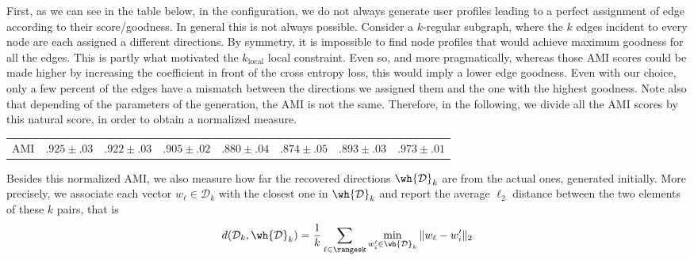 First, as we can see in the table below, in the  configuration, we do not always
generate user profiles leading to a perfect assignment of edge according to their score/goodness. In
general this is not always possible. Consider a $k$-regular subgraph, where the $k$ edges incident
to every node are each assigned a different directions. By symmetry, it is impossible to find node
profiles that would achieve maximum goodness for all the edges. This is partly what motivated the
$k_{\mathrm{local}}$ local constraint. Even so, and more pragmatically, whereas those AMI scores
could be made higher by increasing the coefficient in front of the cross entropy loss, this would
imply a lower edge goodness. Even with our choice, only a few percent of the edges have a mismatch
between the directions we assigned them and the one with the highest goodness. Note also that
depending of the parameters of the generation, the AMI is not the same. Therefore, in the following,
we divide all the AMI scores by this natural score, in order to obtain a normalized measure.
\newline\vspace{.5\baselineskip}\noindent%
\begin{tabular}{lccccccc}
  \toprule
  {}  & {\smallk{}}    & {{}}   & {\largek{}}    & {\smallo{}}    & {\largeo{}}    & {\fdirs{}}     & {\larged{}}    \\
  \midrule
  AMI & $.925 \pm .03$ & $.922 \pm .03$ & $.905 \pm .02$ & $.880 \pm .04$ & $.874 \pm .05$ & $.893 \pm .03$ & $.973 \pm .01$ \\
  \bottomrule
\end{tabular}
\vspace{.5\baselineskip}

Besides this normalized AMI, we also measure how far the recovered directions $\mathcal{\wh{D}}_k$
are from the actual ones, generated initially. More precisely, we associate each vector $w_\ell \in
\mathcal{D}_k$ with the closest one in $\mathcal{\wh{D}}_k$ and report the average $\ell_2$ distance
between the two elements of these $k$ pairs, that is
\begin{equation*}
  d(\mathcal{D}_k, \mathcal{\wh{D}}_k) =
  \frac{1}{k} \sum_{\ell \in \rangesk} \min_{w'_i \in \mathcal{\wh{D}}_k} \| w_\ell - w'_i \|_2
\end{equation*}

